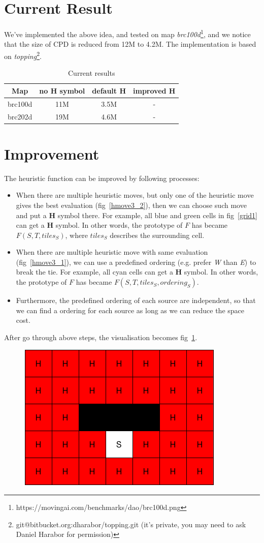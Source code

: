 \documentclass{article}
\begin{document}
\section{Current Result}
We've implemented the above idea, and tested on map
\textit{brc100d}\footnote{https://movingai.com/benchmarks/dao/brc100d.png}, and we notice that
the size of CPD is reduced from 12M to 4.2M. The implementation is based on
\textit{topping}\footnote{git@bitbucket.org:dharabor/topping.git (it's private, you may need to ask Daniel
Harabor for permission)}.

\begin{table}[h]
  \centering
  \begin{tabular}{|c|c|c|c|}
  \hline
    Map       &   no H symbol &  default H & improved H   \\
  \hline
    brc100d   &   11M         &  3.5M      &    -         \\
  \hline
    brc202d   &   19M         &  4.6M      &    -         \\
  \hline
  \end{tabular}
  \caption{Current results}
\end{table}

\section{Improvement}
The heuristic function can be improved by following processes:
\begin{itemize}
  \item When there are multiple heuristic moves, but only one of the heuristic
    move gives the best evaluation (fig~\ref{hmove3_2}), then we can choose such move and put a \textbf{H}
    symbol there. For example, all blue and green cells in fig~\ref{grid1} can get a \textbf{H} symbol.
    In other words, the prototype of $F$ has became $F(S, T, tiles_S)$, where
    $tiles_S$ describes the surrounding cell.

  \item When there are multiple heuristic move with same evaluation (fig~\ref{hmove3_1}), we
    can use a predefined ordering (e.g. prefer \textit{W} than \textit{E}) to break the tie. For example, all cyan cells can get
    a \textbf{H} symbol. In other words, the prototype of $F$ has became $F(S, T, tiles_S, ordering_S)$.

  \item Furthermore, the predefined ordering of each source are independent, so that we can
    find a ordering for each source as long as we can reduce the space cost.

\end{itemize}

After go through above steps, the visualisation becomes fig~\ref{grid2}.

\begin{figure}[t]
  \centering
  \includegraphics[width=.5\textwidth]{./grid2.png}
  \caption{}
  \label{grid2}
\end{figure}
\end{document}
